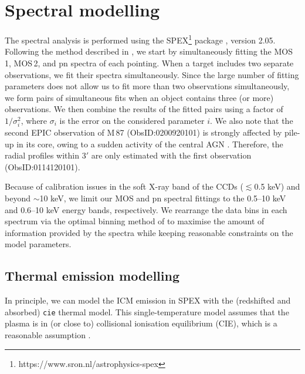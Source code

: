 \documentclass{aa}
\begin{document}

\section{Spectral modelling}\label{sect:spectral_analysis}



The spectral analysis is performed using the SPEX\footnote{https://www.sron.nl/astrophysics-spex} package \citep{1996uxsa.conf..411K}, version 2.05. Following the method described in \citet{2016A&A...592A.157M}, we start by simultaneously fitting the MOS\,1, MOS\,2, and pn spectra of each pointing. When a target includes two separate observations, we fit their spectra simultaneously. Since the large number of fitting parameters does not allow us to fit more than two observations simultaneously, we form pairs of simultaneous fits when an object contains three (or more) observations. We then combine the results of the fitted pairs using a factor of $1/\sigma_i^2$, where $\sigma_i$ is the error on the considered parameter $i$.
We also note that the second EPIC observation of M\,87 (ObsID:0200920101) is strongly affected by pile-up in its core, owing to a sudden activity of the central AGN \citep{2006A&A...459..353W}. Therefore, the radial profiles within 3$'$ are only estimated with the first observation  (ObsID:0114120101).

Because of calibration issues in the soft X-ray band of the CCDs ($\lesssim$0.5 keV) and beyond $\sim$10 keV, we limit our MOS and pn spectral fittings to the 0.5--10 keV and 0.6--10 keV energy bands, respectively. We rearrange the data bins in each spectrum
via the optimal binning method of \citet{2016A&A...587A.151K} to maximise the amount of information provided by the spectra while keeping reasonable constraints on the model parameters.




\subsection{Thermal emission modelling}\label{sect:thermal_mod}

In principle, we can model the ICM emission in SPEX with the (redshifted and absorbed) \texttt{cie} thermal model. This single-temperature model assumes that the plasma is in (or close to) collisional ionisation equilibrium (CIE), which is a reasonable assumption \citep[e.g.][]{1986RvMP...58....1S}. 
\end{document}
